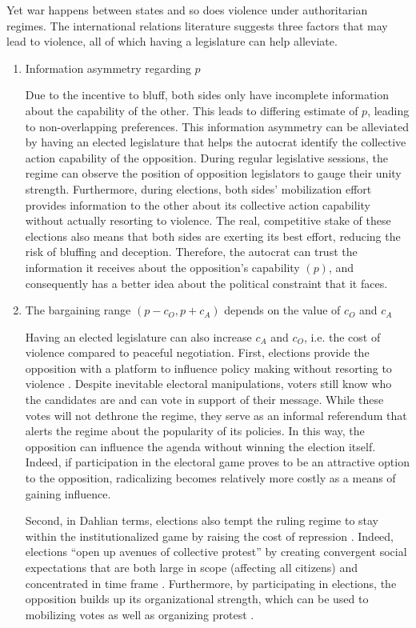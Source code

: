 Yet war happens between states and so does violence under authoritarian regimes. The international relations literature suggests three factors that may lead to violence, all of which having a legislature can help alleviate.

\begin{enumerate}
\item Information asymmetry regarding $p$

Due to the incentive to bluff, both sides only have incomplete information about the capability of the other. This leads to differing estimate of $p$, leading to non-overlapping preferences. This information asymmetry can be alleviated by having an elected legislature that helps the autocrat identify the collective action capability of the opposition. During regular legislative sessions, the regime can observe the position of opposition legislators to gauge their unity strength. Furthermore, during elections, both sides’ mobilization effort provides information to the other about its collective action capability without actually resorting to violence. The real, competitive stake of these elections also means that both sides are exerting its best effort, reducing the risk of bluffing and deception. Therefore, the autocrat can trust the information it receives about the opposition’s capability $(p)$, and consequently has a better idea about the political constraint that it faces.

\item The bargaining range $(p - c_O, p + c_A)$ depends on the value of $c_O$ and $c_A$

Having an elected legislature can also increase $c_A$ and $c_O$, i.e. the cost of violence compared to peaceful negotiation. First, elections provide the opposition with a platform to influence policy making without resorting to violence \citep[14]{Rigger1999}. Despite inevitable electoral manipulations, voters still know who the candidates are and can vote in support of their message. While these votes will not dethrone the regime, they serve as an informal referendum that alerts the regime about the popularity of its policies. In this way, the opposition can influence the agenda without winning the election itself. Indeed, if participation in the electoral game proves to be an attractive option to the opposition, radicalizing becomes relatively more costly as a means of gaining influence.

Second, in Dahlian terms, elections also tempt the ruling regime to stay within the institutionalized game by raising the cost of repression \citep[15]{Dahl1971a}. Indeed, elections “open up avenues of collective protest” by creating convergent social expectations that are both large in scope (affecting all citizens) and concentrated in time frame \citep{Schedler2009}. Furthermore, by participating in elections, the opposition builds up its organizational strength, which can be used to mobilizing votes as well as organizing protest \citep{Thompson2004}.


\end{enumerate}
